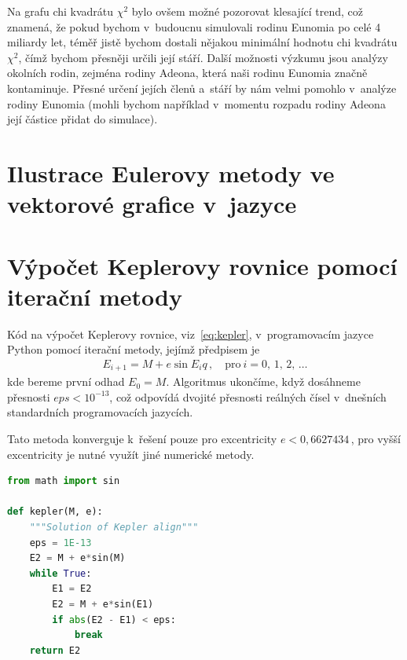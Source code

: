 \documentclass[A4paper, 12pt, oneside]{book}
\begin{document}
Na grafu chi kvadrátu $\chi^2$ bylo ovšem možné pozorovat klesající trend, což znamená, že pokud bychom v~budoucnu simulovali rodinu Eunomia po celé 4 miliardy let, téměř jistě bychom dostali nějakou minimální hodnotu chi kvadrátu $\chi^2$, čímž bychom přesněji určili její stáří. Další možnosti výzkumu jsou analýzy okolních rodin, zejména rodiny Adeona, která naši rodinu Eunomia značně kontaminuje. Přesné určení jejích členů a~stáří by nám velmi pomohlo v~analýze rodiny Eunomia (mohli bychom například v~momentu rozpadu rodiny Adeona její částice přidat do simulace).

\newpage

\printbibliography
\begin{appendices}
	\chapter{Ilustrace Eulerovy metody ve vektorové grafice v~jazyce } \label{app:asy}

	\begin{figure}[!htb]
	\centering
	\end{figure}

	

	\chapter{Výpočet Keplerovy rovnice pomocí iterační metody} \label{app:kepit}
	Kód na výpočet Keplerovy rovnice, viz~\eqref{eq:kepler}, v~programovacím jazyce Python pomocí iterační metody, jejímž předpisem je
	\begin{align*}
		E_{i+1}=M+e\sin{E_i}q\,, \quad \text{pro}\ i=0,\,1,\,2,\,\ldots
	\end{align*}
	kde bereme první odhad $E_0=M$. Algoritmus ukončíme, když dosáhneme přesnosti ${eps<10^{-13}}$, což odpovídá dvojité přesnosti reálných čísel v~dnešních standardních programovacích jazycích.

	Tato metoda konverguje k~řešení pouze pro excentricity $e<0,6627434\,$, pro vyšší excentricity je nutné využít jiné numerické metody.
\begin{lstlisting}[language=Python]
from math import sin

def kepler(M, e):
    """Solution of Kepler align"""
    eps = 1E-13
    E2 = M + e*sin(M)
    while True:
        E1 = E2
        E2 = M + e*sin(E1)
        if abs(E2 - E1) < eps:
            break 
    return E2
\end{lstlisting}

\end{appendices}
\end{document}
